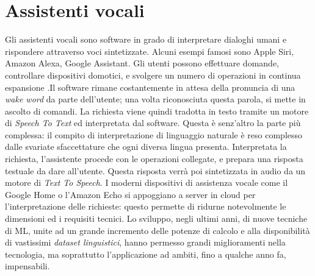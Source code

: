 \section{Assistenti vocali}
\label{section:vocal_assistants}
Gli assistenti vocali sono software in grado di interpretare dialoghi umani e rispondere attraverso voci sintetizzate. Alcuni esempi famosi sono Apple Siri, Amazon Alexa, Google Assistant. Gli utenti possono effettuare domande, controllare dispositivi domotici, e svolgere un numero di operazioni in continua espansione \cite{article:introduction_to_va}.Il software rimane costantemente in attesa della pronuncia di una \textit{wake word} da parte dell'utente; una volta riconosciuta questa parola, si mette in ascolto di comandi. La richiesta viene quindi tradotta in testo tramite un motore di \textit{Speech To Text} ed interpretata dal software. Questa è senz'altro la parte più complessa: il compito di interpretazione di linguaggio naturale è reso complesso dalle svariate sfaccettature che ogni diversa lingua presenta. Interpretata la richiesta, l'assistente procede con le operazioni collegate, e prepara una risposta testuale da dare all'utente. Questa risposta verrà poi sintetizzata in audio da un motore di \textit{Text To Speech}. I moderni dispositivi di assistenza vocale come il Google Home o l'Amazon Echo si appoggiano a server in cloud per l'interpretazione delle richieste: questo permette di ridurne notevolmente le dimensioni ed i requisiti tecnici.
Lo sviluppo, negli ultimi anni, di nuove tecniche di ML, unite ad un grande incremento delle potenze di calcolo e alla disponibilità di vastissimi \textit{dataset linguistici}, hanno permesso grandi miglioramenti nella tecnologia, ma soprattutto l'applicazione ad ambiti, fino a qualche anno fa, impensabili.
